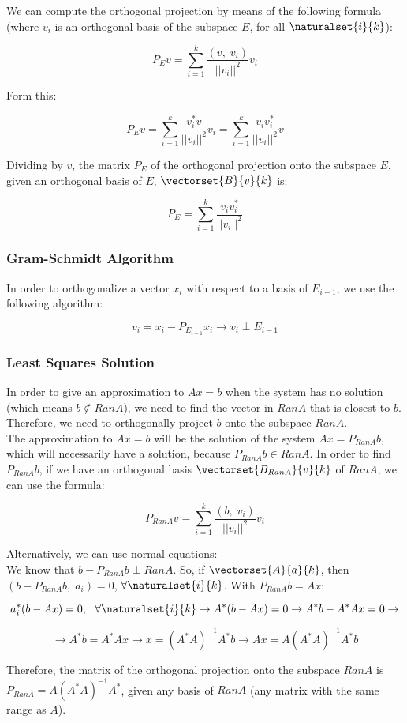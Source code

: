 We can compute the orthogonal projection by means of the following formula (where $v_i$ is an orthogonal basis of the subspace $E$, for all $\naturalset{i}{k}$):

$$P_Ev=\sum_{i=1}^k \frac{(v,\;v_i)}{||v_i||^2}v_i$$

Form this:

$$P_Ev=\sum_{i=1}^k\frac{v_i^*v}{||v_i||^2}v_i=\sum_{i=1}^k\frac{v_iv_i^*}{||v_i||^2}v$$

Dividing by $v$, the matrix $P_E$ of the orthogonal projection onto the subspace $E$, given an orthogonal basis of $E$, $\vectorset{B}{v}{k}$ is:

$$P_E=\sum_{i=1}^k\frac{v_iv_i^*}{||v_i||^2}$$

\subsubsection{Gram-Schmidt Algorithm}

In order to orthogonalize a vector $x_i$ with respect to a basis of $E_{i-1}$, we use the following algorithm:

$$v_i=x_i-P_{E_{i-1}}x_i\rightarrow v_i \perp E_{i-1}$$

\subsubsection{Least Squares Solution}

In order to give an approximation to $Ax=b$ when the system has no solution (which means $b\notin RanA$), we need to find the vector in $RanA$ that is closest to $b$. Therefore, we need to orthogonally project $b$ onto the subspace $RanA$.\\

The approximation to $Ax=b$ will be the solution of the system $Ax=P_{RanA}b$, which will necessarily have a solution, because $P_{RanA}b \in RanA$. In order to find $P_{RanA}b$, if we have an orthogonal basis $\vectorset{B_{RanA}}{v}{k}$ of $RanA$, we can use the formula:

$$P_{RanA}v=\sum_{i=1}^k\frac{(b,\;v_i)}{||v_i||^2}v_i$$

Alternatively, we can use normal equations:\\

We know that $b-P_{RanA}b \perp RanA$. So, if $\vectorset{A}{a}{k}$, then $(b-P_{RanA}b,\;a_i)=0$, $\forall \naturalset{i}{k}$. With $P_{RanA}b=Ax$:

$$a_i^*(b-Ax)=0,\text{ }\text{ }\forall \naturalset{i}{k} \rightarrow A^*(b-Ax)=0 \rightarrow A^*b-A^*Ax=0 \rightarrow$$

$$\rightarrow A^*b=A^*Ax \rightarrow x=(A^*A)^{-1}A^*b \rightarrow Ax=A(A^*A)^{-1}A^*b$$

Therefore, the matrix of the orthogonal projection onto the subspace $RanA$ is $P_{RanA}=A(A^*A)^{-1}A^*$, given any basis of $RanA$ (any matrix with the same range as $A$).